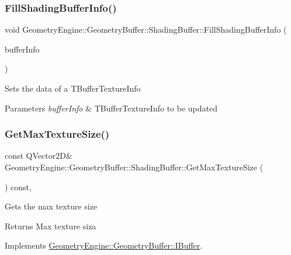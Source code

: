 \subsubsection{\texorpdfstring{FillShadingBufferInfo()}{FillShadingBufferInfo()}}
{\footnotesize\ttfamily void Geometry\+Engine\+::\+Geometry\+Buffer\+::\+Shading\+Buffer\+::\+Fill\+Shading\+Buffer\+Info (\begin{DoxyParamCaption}\item[{\mbox{\hyperlink{class_geometry_engine_1_1_shading_buffer_texture_info}{Shading\+Buffer\+Texture\+Info}} \&}]{buffer\+Info }\end{DoxyParamCaption})}

Sets the data of a T\+Buffer\+Texture\+Info 
\begin{DoxyParams}{Parameters}
{\em buffer\+Info} & T\+Buffer\+Texture\+Info to be updated \\
\hline
\end{DoxyParams}
\mbox{\label{class_geometry_engine_1_1_geometry_buffer_1_1_shading_buffer_a6b45a6a2cc97775c11b6c6ff72bbc2b6}} 
\subsubsection{\texorpdfstring{GetMaxTextureSize()}{GetMaxTextureSize()}}
{\footnotesize\ttfamily const Q\+Vector2D\& Geometry\+Engine\+::\+Geometry\+Buffer\+::\+Shading\+Buffer\+::\+Get\+Max\+Texture\+Size (\begin{DoxyParamCaption}{ }\end{DoxyParamCaption}) const\hspace{0.3cm}{\ttfamily [inline]}, {\ttfamily [virtual]}}

Gets the max texture size \begin{DoxyReturn}{Returns}
Max texture siza 
\end{DoxyReturn}


Implements \mbox{\hyperlink{class_geometry_engine_1_1_geometry_buffer_1_1_i_buffer_a0fe7b527d30dc9c5437b8723de2c8746}{Geometry\+Engine\+::\+Geometry\+Buffer\+::\+I\+Buffer}}.

\mbox{\label{class_geometry_engine_1_1_geometry_buffer_1_1_shading_buffer_aae6f448abdadd4ef47b7b19984fc3831}} 
